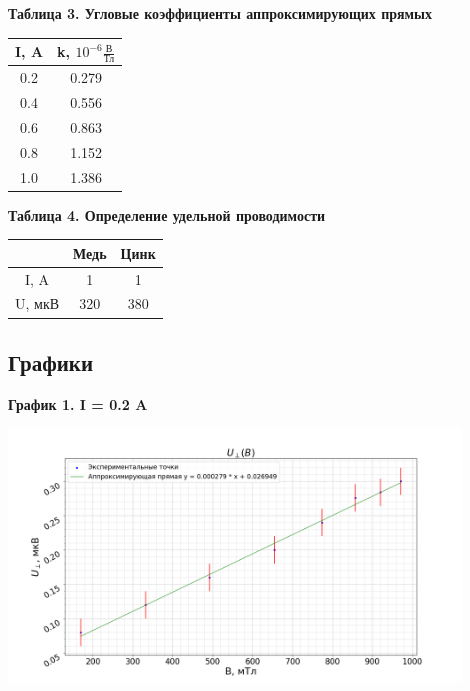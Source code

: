 \documentclass[15pt,a5paper,reqno]{article}
\begin{document}
    \noindent\hypertarget{table_3}{\textbf{Таблица 3. Угловые коэффициенты аппроксимирующих прямых}}
    \begin{center}
        \begin{tabular}{|c|c|}
             \hline
             I, A & k, $10^{-6}\frac{\text{В}}{\text{Тл}}$ \\ \hline\hline
             0.2 & 0.279 \\ \hline
             0.4 & 0.556 \\ \hline
             0.6 & 0.863 \\ \hline
             0.8 & 1.152 \\ \hline
             1.0 & 1.386 \\ \hline
        \end{tabular}
    \end{center}

    \noindent\hypertarget{table_3}{\textbf{Таблица 4. Определение удельной проводимости}}
    \begin{center}
        \begin{tabular}{|c|c|c|}
            \hline
                   & Медь & Цинк \\ \hline
            I, A   &  1   & 1    \\ \hline
            U, мкВ & 320  & 380  \\ \hline 
        \end{tabular}
    \end{center}

    \newpage
    \subsection{Графики}

    \noindent\hypertarget{graph_1}{\textbf{График 1. I = 0.2 A}}
    \begin{center}
        \includegraphics[width = 0.9\textwidth]{images/graph_1.png}
    \end{center}
\end{document}
